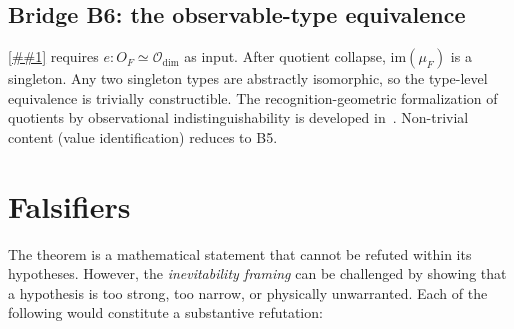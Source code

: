 \documentclass[11pt]{article}
\providecommand{\Cref}[1]{\ref{##1}}%
\newcommand{\Odim}{\mathcal{O}_{\mathrm{dim}}}
\theoremstyle{definition}
\theoremstyle{remark}
\begin{document}
\subsection{Bridge B6: the observable-type equivalence}
\label{sec:bridge-b6}

\Cref{cor:equiv} requires $e : O_F \simeq \Odim$ as input.
After quotient collapse, $\mathrm{im}(\mu_F)$ is a singleton.
Any two singleton types are abstractly isomorphic,
so the type-level equivalence is trivially constructible.
The recognition-geometric formalization of quotients by
observational indistinguishability is developed
in~\cite{RecogGeom2026}.
Non-trivial content (value identification) reduces to B5.

\section{Falsifiers}\label{sec:falsifiers}

The theorem is a mathematical statement that cannot be refuted
within its hypotheses.
However, the \emph{inevitability framing} can be challenged by
showing that a hypothesis is too strong, too narrow, or physically
unwarranted.
Each of the following would constitute a substantive refutation:
\end{document}
